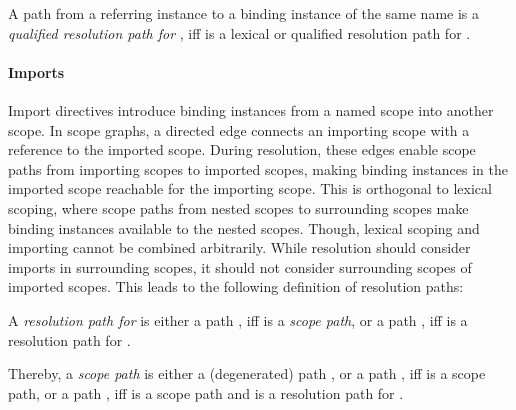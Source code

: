 \begin{definition}
  A path 
  from a referring instance  
  to a binding instance  of the same name
  is a \emph{qualified resolution path for }, 
    iff  is 
      a lexical or qualified resolution path for \emph{}.
\end{definition}

\paragraph{Imports}

Import directives introduce binding instances from a named scope into another scope.
In scope graphs, a directed edge  connects 
  an importing scope 
  with a reference  to the imported scope.
During resolution, these edges enable scope paths from importing scopes to imported scopes,
  making binding instances in the imported scope reachable for the importing scope.
This is orthogonal to lexical scoping, where scope paths from nested scopes to surrounding scopes
  make binding instances available to the nested scopes.  
Though, lexical scoping and importing cannot be combined arbitrarily.
While resolution should consider imports in surrounding scopes,
  it should not consider surrounding scopes of imported scopes.
This leads to the following definition of resolution paths:

\begin{definition}
A \emph{resolution path for } is either
  a path , 
    iff  is a \emph{scope path}, or
  a path ,
    iff  is a resolution path for \emph{}.

Thereby, a \emph{scope path} is either
  a (degenerated) path , or 
  a path , 
    iff  is a scope path, or
  a path , 
    iff  is a scope path and
     is a resolution path for \emph{}.
\end{definition}

